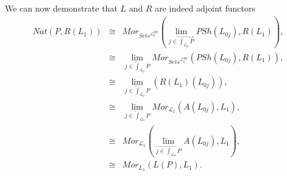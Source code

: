 \begin{frame}
We can now demonstrate that $L$ and $R$ are indeed adjoint functors
\begin{eqnarray*}
Nat(P,R(L_1)) & \cong &  Mor_{\textit{Sets}^{\mathcal{L}_0^{opp}}} \left( \lim\limits_{\overrightarrow{j \in \int_{\mathcal{L}_0} P}} PSh (L_{0j}),R(L_1) \right) ,\\	
			  & \cong &  \lim\limits_{\overleftarrow{j \in \int_{\mathcal{L}_0} P}} Mor_{\textit{Sets}^{\mathcal{L}_0^{opp}}} \left( PSh (L_{0j}),R(L_1) \right) ,\\
			  & \cong &  \lim\limits_{\overleftarrow{j \in \int_{\mathcal{L}_0} P}} \left( R(L_1)(L_{0j}) \right) ,\\
  			  & \cong &  \lim\limits_{\overleftarrow{j \in \int_{\mathcal{L}_0} P}} Mor_{\mathcal{L}_1} \left( A (L_{0j}),L_1 \right) ,\\
  			  & \cong &  Mor_{\mathcal{L}_1} \left( \lim\limits_{\overrightarrow{j \in \int_{\mathcal{L}_0} P}} A (L_{0j}),L_1 \right) ,\\
  			  & \cong &  Mor_{L_1}(L(P),L_1).
\end{eqnarray*}
\end{frame}
